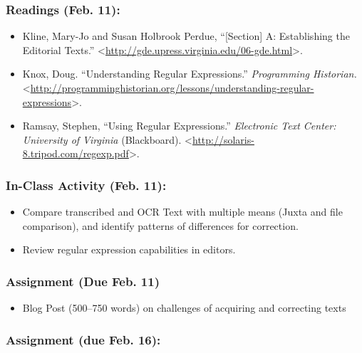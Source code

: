 \documentclass[]{article}
\begin{document}
\subsubsection{Readings (Feb. 11):}\label{readings-feb.-11}

\begin{itemize}
\itemsep1pt\parskip0pt
\item
  Kline, Mary-Jo and Susan Holbrook Perdue, ``{[}Section{]} A:
  Establishing the Editorial Texts.''
  \textless{}\url{http://gde.upress.virginia.edu/06-gde.html}\textgreater{}.
\item
  Knox, Doug. ``Understanding Regular Expressions.'' \emph{Programming
  Historian.}
  \textless{}\url{http://programminghistorian.org/lessons/understanding-regular-expressions}\textgreater{}.
\item
  Ramsay, Stephen, ``Using Regular Expressions.'' \emph{Electronic Text
  Center: University of Virginia} (Blackboard).
  \textless{}\url{http://solaris-8.tripod.com/regexp.pdf}\textgreater{}.
\end{itemize}

\subsubsection{In-Class Activity (Feb.
11):}\label{in-class-activity-feb.-11}

\begin{itemize}
\itemsep1pt\parskip0pt
\item
  Compare transcribed and OCR Text with multiple means (Juxta and file
  comparison), and identify patterns of differences for correction.
\item
  Review regular expression capabilities in editors.
\end{itemize}

\subsubsection{Assignment (Due Feb. 11)}\label{assignment-due-feb.-11}

\begin{itemize}
\itemsep1pt\parskip0pt
\item
  Blog Post (500--750 words) on challenges of acquiring and correcting
  texts
\end{itemize}

\subsubsection{Assignment (due Feb. 16):}\label{assignment-due-feb.-16}
\end{document}

